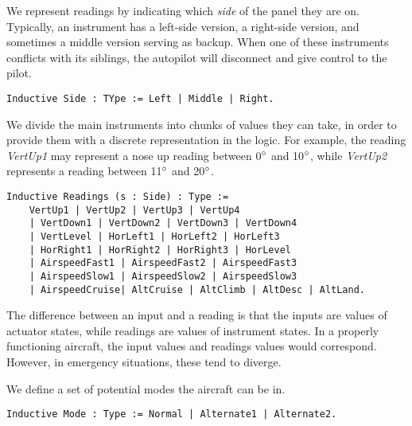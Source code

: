 We represent readings by indicating which \emph{side} of the panel they are on. Typically, an instrument has a left-side version, a right-side version, and sometimes a middle version serving as backup. When one of these instruments conflicts with its siblings, the autopilot will disconnect and give control to the pilot.


\begin{tcolorbox}
	\begin{lstlisting}[language=Coq]
	Inductive Side : TYpe := Left | Middle | Right.
	\end{lstlisting}	
	
\end{tcolorbox}

We divide the main instruments into chunks of values they can take, in order to provide them with a discrete representation in the logic. For example, the reading \emph{VertUp1} may represent a nose up reading between 0$\degree$ and 10$\degree$, while \emph{VertUp2} represents a reading between 11$\degree$ and 20$\degree$.

\begin{tcolorbox}
	\begin{lstlisting}[language=Coq]
	Inductive Readings (s : Side) : Type := 
	VertUp1 | VertUp2 | VertUp3 | VertUp4 
	| VertDown1 | VertDown2 | VertDown3 | VertDown4 
	| VertLevel | HorLeft1 | HorLeft2 | HorLeft3 
	| HorRight1 | HorRight2 | HorRight3 | HorLevel
	| AirspeedFast1 | AirspeedFast2 | AirspeedFast3 
	| AirspeedSlow1 | AirspeedSlow2 | AirspeedSlow3 
	| AirspeedCruise| AltCruise | AltClimb | AltDesc | AltLand.
	\end{lstlisting}	
	
\end{tcolorbox}

The difference between an input and a reading is that the inputs are values of actuator states, while readings are values of instrument states. In a properly functioning aircraft, the input values and readings values would correspond. However, in emergency situations, these tend to diverge.

We define a set of potential modes the aircraft can be in.

\begin{tcolorbox}
	\begin{lstlisting}[language=Coq]
	Inductive Mode : Type := Normal | Alternate1 | Alternate2.
	\end{lstlisting}
\end{tcolorbox}

